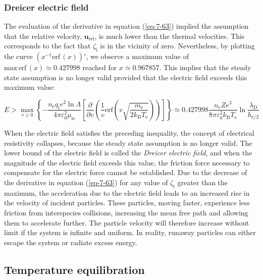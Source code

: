 \subsubsection{Dreicer electric field}

The evaluation of the derivative in equation (\ref{eq-7-63}) implied the assumption that the relative velocity, $\mathbf{u}_\text{rel}$, is much lower than the thermal velocities. This corresponds to the fact that $\zeta_\mathrm{i}$ is in the vicinity of zero. Nevertheless, by plotting the curve $(x^{-1}\mathrm{erf}\,(x))'$, we observe a maximum value of $\text{max}\,\mathrm{erf}\,(x)\simeq0.427998$ reached for $x\simeq0.967857$. This implies that the steady state assumption is no longer valid provided that the electric field exceeds this maximum value:

\begin{equation}
    E>\max_{v\geq0}{\left\{-\frac{n_\text{e}q_\mathrm{i}e^2\ln{\Lambda}}{4\pi\varepsilon_0^2\mu_\text{ie}}\left[\frac{\partial}{\partial v}\left(\frac{1}{v}\mathrm{erf}\left(v\sqrt{\frac{m_\text{e}}{2k_\mathrm{B}T_\text{e}}}\right)\right)\right]\right\}}\simeq0.427998\frac{n_\text{e}Ze^3}{8\pi\varepsilon_0^2k_\mathrm{B}T_\text{e}}\ln{\frac{\lambda_\mathrm{D}}{b_{\pi/2}}}
\end{equation}

When the electric field satisfies the preceding inequality, the concept of electrical resistivity collapses, because the steady state assumption is no longer valid. The lower bound of the electric field is called the \textit{Dreicer electric field}, and when the magnitude of the electric field exceeds this value, the friction force necessary to compensate for the electric force cannot be established. Due to the decrease of the derivative in equation (\ref{eq-7-63}) for any value of $\zeta_\mathrm{i}$ greater than the maximum, the acceleration due to the electric field leads to an increased rise in the velocity of incident particles. These particles, moving faster, experience less friction from interspecies collisions, increasing the mean free path and allowing them to accelerate further. The particle velocity will therefore increase without limit if the system is infinite and uniform. In reality, runaway particles can either escape the system or radiate excess energy.

\subsection{Temperature equilibration}

